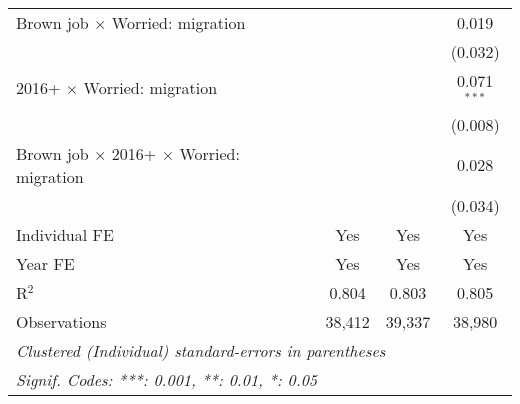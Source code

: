 \begin{table}[htbp]
\begin{tabular}{lccc}
      Brown job $\times$ Worried: migration                               &             &             & 0.019\\   
                                                                          &             &             & (0.032)\\   
      2016+ $\times$ Worried: migration                                   &             &             & 0.071$^{***}$\\   
                                                                          &             &             & (0.008)\\   
      Brown job $\times$ 2016+ $\times$ Worried: migration                &             &             & 0.028\\   
                                                                          &             &             & (0.034)\\   
      Individual FE                                                       & Yes         & Yes         & Yes\\  
      Year FE                                                             & Yes         & Yes         & Yes\\  
      R$^2$                                                               & 0.804       & 0.803       & 0.805\\  
      Observations                                                        & 38,412      & 39,337      & 38,980\\  
      \midrule \midrule
      \multicolumn{4}{l}{\emph{Clustered (Individual) standard-errors in parentheses}}\\
      \multicolumn{4}{l}{\emph{Signif. Codes: ***: 0.001, **: 0.01, *: 0.05}}\\
   \end{tabular}
\end{table}



